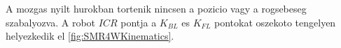 A mozgas nyilt hurokban tortenik nincsen a pozicio vagy a rogsebeseg szabalyozva.
A robot $ICR$ pontja a $K_{BL}$ es $K_{FL}$ pontokat oszekoto tengelyen helyezkedik el \ref{fig:SMR4WKinematics}.









